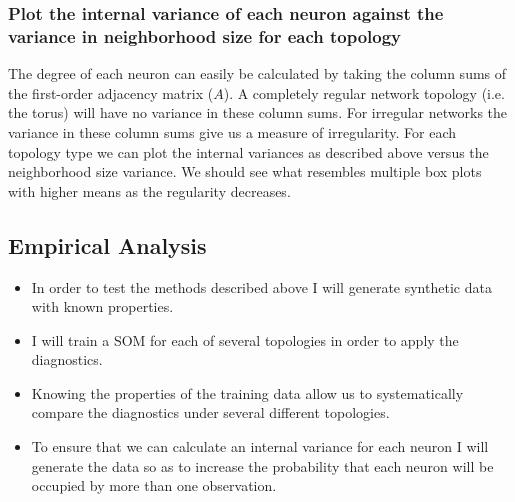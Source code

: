 \documentclass[10pt,titlepage]{article}
\begin{document}
\subsubsection{Plot the internal variance of each neuron against the variance in neighborhood size for each topology}
The degree of each neuron can easily be calculated by taking the column sums of
the first-order adjacency matrix ($A$).  A completely regular network
topology (i.e. the torus) will have no variance in these column sums.  For
irregular networks the variance in these column sums give us a measure of
irregularity.  For each topology type we can plot the internal
variances as described above versus the neighborhood size variance.  We should see
what resembles multiple box plots with higher means as the regularity decreases. 

\subsection{Empirical Analysis}
\begin{itemize}
\item In order to test the methods described above I will generate synthetic data with
known properties.
\item I will train a SOM for each of several topologies in order to apply the
diagnostics.
\item Knowing the properties of the training data allow us to systematically
compare the diagnostics under several different topologies.
\item To ensure that we can calculate an internal variance for
each neuron I will generate the data so as to increase the
probability that each neuron will be occupied by more than one observation.
\end{itemize}


\end{document}
